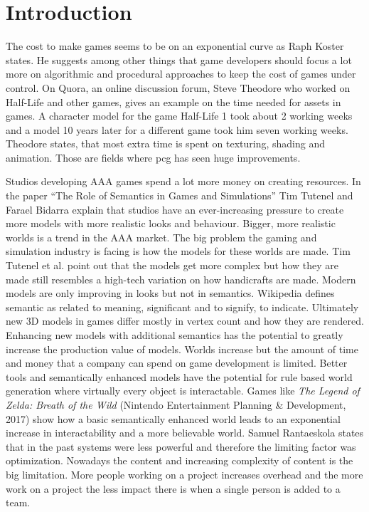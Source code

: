 \documentclass[10pt,a4paper]{article}
\begin{document}
\section{Introduction}\label{sec:Introduction}
\begin{multicols}{2}
The cost to make games seems to be on an exponential curve as Raph Koster states. He suggests among other things that game developers should focus a lot more on algorithmic and procedural approaches to keep the cost of games under control\cite{Koster2018}. On Quora, an online discussion forum, Steve Theodore who worked on Half-Life and other games, gives an example on the time needed for assets in games. A character model for the game Half-Life 1 took about 2 working weeks and a model 10 years later for a different game took him seven working weeks. Theodore states, that most extra time is spent on texturing, shading and animation\cite{Prinke2017}. Those are fields where \gls{pcg} has seen huge improvements.

Studios developing AAA games spend a lot more money on creating resources. In the paper “The Role of Semantics in Games and Simulations” Tim Tutenel and Farael Bidarra explain that studios have an ever-increasing pressure to create more models with more realistic looks and behaviour. Bigger, more realistic worlds is a trend in the AAA market. The big problem the gaming and simulation industry is facing is how the models for these worlds are made. Tim Tutenel et al. point out that the models get more complex but how they are made still resembles a high-tech variation on how handicrafts are made\cite{Tutenel2008}. Modern models are only improving in looks but not in semantics. Wikipedia defines semantic as related to meaning, significant and to signify, to indicate. Ultimately new 3D models in games differ mostly in vertex count and how they are rendered. Enhancing new models with additional semantics has the potential to greatly increase the production value of models. Worlds increase but the amount of time and money that a company can spend on game development is limited. Better tools and semantically enhanced models have the potential for rule based world generation where virtually every object is interactable. Games like \textit{The Legend of Zelda: Breath of the Wild} (Nintendo Entertainment Planning \& Development, 2017) show how a basic semantically enhanced world leads to an exponential increase in interactability and a more believable world. Samuel Rantaeskola\cite{Prinke2017} states that in the past systems were less powerful and therefore the limiting factor was optimization. Nowadays the content and increasing complexity of content is the big limitation. More people working on a project increases overhead and the more work on a project the less impact there is when a single person is added to a team.


\end{multicols}
\end{document}
